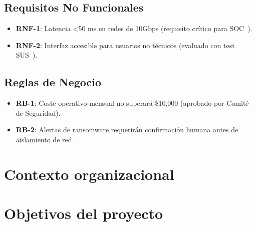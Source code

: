 \subsection{Requisitos No Funcionales}   \label{sec.req-no-funcionales}
\begin{itemize}  
    \item \textbf{RNF-1}: Latencia <50 ms en redes de 10Gbps (requisito crítico para SOC~\cite{nist2021ai}).  
    \item \textbf{RNF-2}: Interfaz accesible para usuarios no técnicos (evaluado con test SUS~\cite{brooke1996sus}).  
\end{itemize}  

\subsection{Reglas de Negocio}   \label{sec.reglas-neogcio}
\begin{itemize}  
    \item \textbf{RB-1}: Coste operativo mensual no superará \$10,000 (aprobado por Comité de Seguridad).  
    \item \textbf{RB-2}: Alertas de ransomware requerirán confirmación humana antes de aislamiento de red.  
\end{itemize}  
\section{Contexto organizacional} \label{sec.contexto-organizacional}


\section{Objetivos del proyecto}